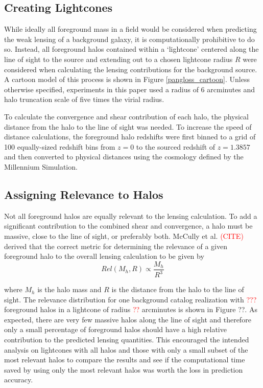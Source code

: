 \documentclass[%
 reprint,
 amsmath,amssymb,
 aps,nofootinbib
]{revtex4-1}
\begin{document}
\subsection{Creating Lightcones}

While ideally all foreground mass in a field would be considered when predicting the weak lensing of a background galaxy, it is computationally prohibitive to do so. Instead, all foreground halos contained within a `lightcone' centered along the line of sight to the source and extending out to a chosen lightcone radius $R$ were considered when calculating the lensing contributions for the background source. A cartoon model of this process is shown in Figure \ref{pangloss_cartoon}. Unless otherwise specified, experiments in this paper used a radius of 6 arcminutes and halo truncation scale of five times the virial radius.

To calculate the convergence and shear contribution of each halo, the physical distance from the halo to the line of sight was needed. To increase the speed of distance calculations, the foreground halo redshifts were first binned to a grid of 100 equally-sized redshift bins from $z=0$ to the sourced redshift of $z=1.3857$ and then converted to physical distances using the cosmology defined by the Millennium Simulation.

\subsection{Assigning Relevance to Halos}

Not all foreground halos are equally relevant to the lensing calculation. To add a significant contribution to the combined shear and convergence, a halo must be massive, close to the line of sight, or preferably both. McCully et al. \textcolor{red}{(CITE)} derived that the correct metric for determining the relevance of a given foreground halo to the overall lensing calculation to be given by
\begin{equation}\label{relevant}
Rel(M_h,R)\propto\frac{M_h}{R^3}
\end{equation}

where $M_h$ is the halo mass and $R$ is the distance from the halo to the line of sight. The relevance distribution for one background catalog realization with \textcolor{red}{???} foreground halos in a lightcone of radius \textcolor{red}{??} arcminutes is shown in Figure ??. As expected, there are very few massive halos along the line of sight and therefore only a small percentage of foreground halos should have a high relative contribution to the predicted lensing quantities. This encouraged the intended analysis on lightcones with all halos and those with only a small subset of the most relevant halos to compare the results and see if the computational time saved by using only the most relevant halos was worth the loss in prediction accuracy.
\end{document}
